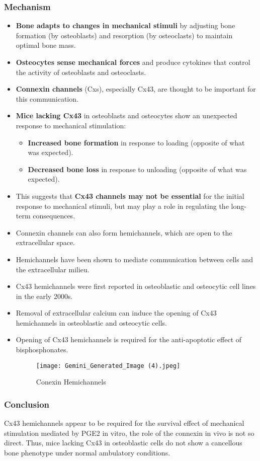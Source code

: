 \documentclass{article}
\begin{document}
\subsubsection{Mechanism}
\begin{itemize}
\item \textbf{Bone adapts to changes in mechanical stimuli} by adjusting bone formation (by osteoblasts) and resorption (by osteoclasts) to maintain optimal bone mass.
\item \textbf{Osteocytes sense mechanical forces} and produce cytokines that control the activity of osteoblasts and osteoclasts.
\item \textbf{Connexin channels} (Cxs), especially Cx43, are thought to be important for this communication.
\item \textbf{Mice lacking Cx43} in osteoblasts and osteocytes show an unexpected response to mechanical stimulation:
\begin{itemize}
\item \textbf{Increased bone formation} in response to loading (opposite of what was expected).
\item \textbf{Decreased bone loss} in response to unloading (opposite of what was expected).
\end{itemize}
\item This suggests that \textbf{Cx43 channels may not be essential} for the initial response to mechanical stimuli, but may play a role in regulating the long-term consequences.
\item Connexin channels can also form hemichannels, which are open to the extracellular space.
\item Hemichannels have been shown to mediate communication between cells and the extracellular milieu.
\item Cx43 hemichannels were first reported in osteoblastic and osteocytic cell lines in the early 2000s.
\item Removal of extracellular calcium can induce the opening of Cx43 hemichannels in osteoblastic and osteocytic cells.
\item Opening of Cx43 hemichannels is required for the anti-apoptotic effect of bisphosphonates.
\begin{figure}[h]
    \centering
    \texttt{[image: Gemini\_Generated\_Image (4).jpeg]}
    \caption{Conexin Hemichannels}
    \label{fig:enter-label}
\end{figure}
\end{itemize}
\subsubsection{Conclusion}
Cx43 hemichannels appear to be required for the survival effect of mechanical stimulation mediated by PGE2 in vitro, the role of the connexin in vivo is not so direct. Thus, mice lacking Cx43 in osteoblastic cells do not show a cancellous bone phenotype under normal ambulatory conditions.
\end{document}
